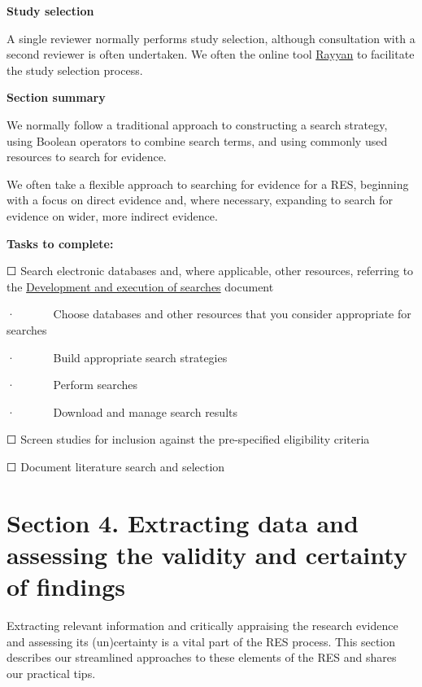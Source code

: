 \documentclass[
  letterpaper,
  DIV=11,
  numbers=noendperiod]{scrreprt}
\begin{document}
\textbf{Study selection}

A single reviewer normally performs study selection, although
consultation with a second reviewer is often undertaken. We often the
online tool \href{https://www.rayyan.ai/}{Rayyan} to facilitate the
study selection process.

\textbf{Section summary}

We normally follow a traditional approach to constructing a search
strategy, using Boolean operators to combine search terms, and using
commonly used resources to search for evidence.

We often take a flexible approach to searching for evidence for a RES,
beginning with a focus on direct evidence and, where necessary,
expanding to search for evidence on wider, more indirect evidence.

\textbf{Tasks to complete:}

☐ Search electronic databases and, where applicable, other resources,
referring to the
\href{https://livemanchesterac-my.sharepoint.com/personal/chunhu_shi_manchester_ac_uk/Documents/Documents/Research/Projects/RES/Manual/Development\%20and\%20execution\%20of\%20searches.docx}{Development
and execution of searches} document

·~~~~~~ Choose databases and other resources that you consider
appropriate for searches

·~~~~~~ Build appropriate search strategies

·~~~~~~ Perform searches

·~~~~~~ Download and manage search results

☐ Screen studies for inclusion against the pre-specified eligibility
criteria

☐ Document literature search and selection


\chapter{Section 4. Extracting data and assessing the validity and
certainty of
findings}\label{section-4.-extracting-data-and-assessing-the-validity-and-certainty-of-findings}

Extracting relevant information and critically appraising the research
evidence and assessing its (un)certainty is a vital part of the RES
process. This section describes our streamlined approaches to these
elements of the RES and shares our practical tips.
\end{document}
